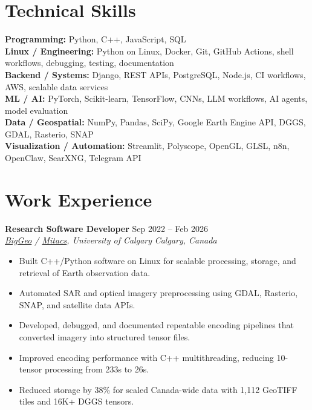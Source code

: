 \documentclass[a4paper,10pt]{article}
\newcommand{\resumeSubheading}[4]{
    \textbf{#1} \hfill #2 \\
    \textit{#3} \hfill \textit{#4}
}
\begin{document}
\section*{Technical Skills}

\textbf{Programming:} Python, C++, JavaScript, SQL \\
\textbf{Linux / Engineering:} Python on Linux, Docker, Git, GitHub Actions, shell workflows, debugging, testing, documentation \\
\textbf{Backend / Systems:} Django, REST APIs, PostgreSQL, Node.js, CI workflows, AWS, scalable data services \\
\textbf{ML / AI:} PyTorch, Scikit-learn, TensorFlow, CNNs, LLM workflows, AI agents, model evaluation \\
\textbf{Data / Geospatial:} NumPy, Pandas, SciPy, Google Earth Engine API, DGGS, GDAL, Rasterio, SNAP \\
\textbf{Visualization / Automation:} Streamlit, Polyscope, OpenGL, GLSL, n8n, OpenClaw, SearXNG, Telegram API


\section*{Work Experience}

\resumeSubheading
{Research Software Developer}
{Sep 2022 -- Feb 2026}
{\href{https://biggeo.com}{BigGeo} / \href{https://www.mitacs.ca/}{Mitacs}, University of Calgary}
{Calgary, Canada}
\begin{itemize}[leftmargin=0.25in]
    \item Built C++/Python software on Linux for scalable processing, storage, and retrieval of Earth observation data.
    \item Automated SAR and optical imagery preprocessing using GDAL, Rasterio, SNAP, and satellite data APIs.
    \item Developed, debugged, and documented repeatable encoding pipelines that converted imagery into structured tensor files.
    \item Improved encoding performance with C++ multithreading, reducing 10-tensor processing from 233s to 26s.
    \item Reduced storage by 38\% for scaled Canada-wide data with 1,112 GeoTIFF tiles and 16K+ DGGS tensors.
\end{itemize}
\end{document}
